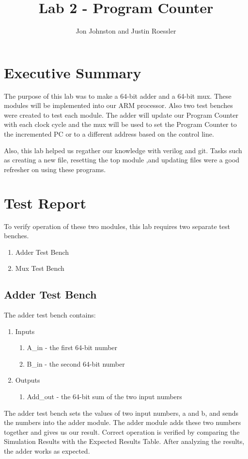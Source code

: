 \documentclass{article}
\author{Jon Johnston and Justin Roessler}
\title{Lab 2 - Program Counter}
\begin{document}
\maketitle

\section{Executive Summary}
The purpose of this lab was to make a 64-bit adder and a 64-bit mux. These modules will be implemented into our ARM processor. Also two test benches were created to test each module. The adder will update our Program Counter with each clock cycle and the mux will be used to set the Program Counter to the incremented PC or to a different address based on the control line. 

Also, this lab helped us regather our knowledge with verilog and git. Tasks such as creating a new file, resetting the top module ,and updating files were a good refresher on using these programs.

\section{Test Report}
To verify operation of these two modules, this lab requires two separate test benches.
\begin{enumerate}
	\item Adder Test Bench
	\item Mux Test Bench
\end{enumerate}

\subsection{Adder Test Bench}
The adder test bench contains:
\begin{enumerate}
	\item Inputs
	\begin{enumerate}
		\item A\_in - the first 64-bit number
		\item B\_in - the second 64-bit number
	\end{enumerate}	
	\item Outputs
	\begin{enumerate}	
		\item Add\_out - the 64-bit sum of the two input numbers
	\end{enumerate}
\end{enumerate} 
The adder test bench sets the values of two input numbers, a and b, and sends the numbers into the adder module. The adder module adds these two numbers together and gives us our result. Correct operation is verified by comparing the Simulation Results with the Expected Results Table.  After analyzing the results, the adder works as expected.
\end{document}
